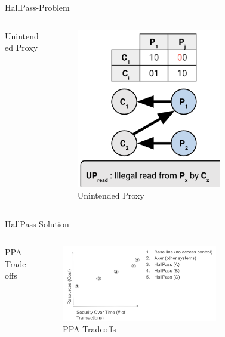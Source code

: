 \begin{frame}{HallPass-Problem}
    \begin{columns}
        \begin{column}{0.5\textwidth}
            Unintended Proxy
        \end{column}
        \begin{column}{0.5\textwidth}
            \begin{figure}
            \centering
            \includegraphics[height=0.7\textheight,width=0.7\textwidth,keepaspectratio]{proxy.png}
            \caption{Unintended Proxy}
        \end{figure}
        \end{column}
    \end{columns}
\end{frame}

\begin{frame}{HallPass-Solution}
    \begin{columns}
        \begin{column}{0.5\textwidth}
        PPA Tradeoffs
        \end{column}
        \begin{column}{0.5\textwidth}
            \begin{figure}
            \centering
            \includegraphics[height=0.7\textheight,width=0.7\textwidth,keepaspectratio]{tradeoffs.png}
            \caption{PPA Tradeoffs}
            \end{figure}
        \end{column}
    \end{columns}
\end{frame}

